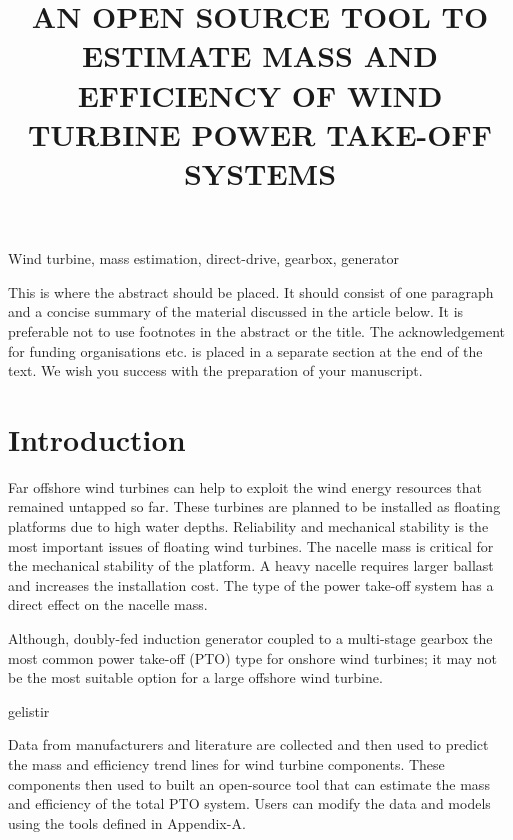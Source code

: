 \documentclass{article}\usepackage{graphicx, color}
\begin{document}
\title{AN OPEN SOURCE TOOL TO ESTIMATE MASS AND EFFICIENCY OF WIND TURBINE POWER TAKE-OFF SYSTEMS}


\maketitle

\keywords
Wind turbine, mass estimation, direct-drive, gearbox, generator

\abstract
This is where the abstract should be placed. It should
consist of one paragraph and a concise summary of the
material discussed in the article below. It is preferable not
to use footnotes in the abstract or the title. The
acknowledgement for funding organisations etc. is placed
in a separate section at the end of the text. We wish you
success with the preparation of your manuscript.

\section{Introduction}

Far offshore wind turbines can help to exploit the wind energy resources that remained untapped so far. These turbines are planned to be installed as floating platforms due to high water depths. Reliability and mechanical stability is the most important issues of floating wind turbines. The nacelle mass is critical for the mechanical stability of the platform. A heavy nacelle requires larger ballast and increases the installation cost. The type of the power take-off system has a direct effect on the nacelle mass.

Although, doubly-fed induction generator coupled to a multi-stage gearbox the most common power take-off (PTO) type for onshore wind turbines; it may not be the most suitable option for a large offshore wind turbine.

gelistir

Data from manufacturers and literature are collected and then used to predict the  mass and efficiency trend lines for wind turbine components. These components then used to built an open-source tool that can estimate the mass and efficiency of the total PTO system. Users can modify the data and models using the tools defined in Appendix-A.
\end{document}
